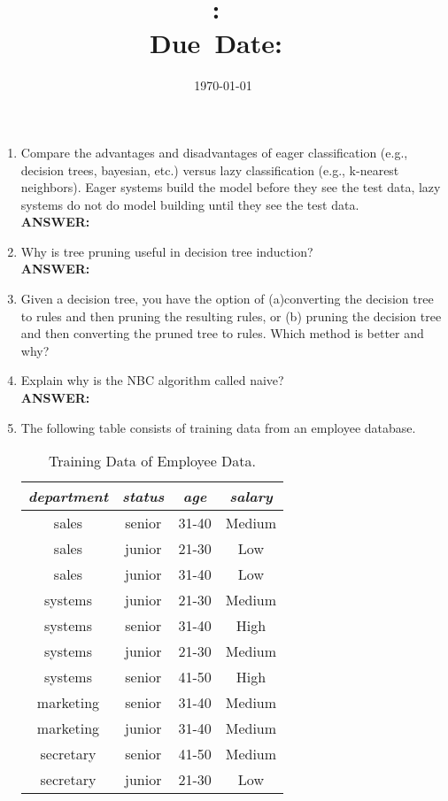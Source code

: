 \documentclass{article}
\title{\textbf{\hmwkClass:\ 
      \hmwkTitle}\\\normalsize\small{Due\ Date:\
    \hmwkDueDate}}
\date{\today}
\author{\textbf{\hmwkAuthorName}}
\begin{document}
\maketitle

\begin{enumerate}
\item Compare the advantages and disadvantages of eager classification
  (e.g., decision trees, bayesian, etc.) versus lazy classification
  (e.g., k-nearest neighbors). Eager systems build the model before
  they see the test data, lazy systems do not do model building until
  they see the test data. \\
\textbf{ANSWER:}


\item Why is tree pruning useful in decision tree induction? \\
\textbf{ANSWER:} 

\item Given a decision tree, you have the option of (a)converting the
  decision tree to rules and then pruning the resulting rules, or (b)
  pruning the decision tree and then converting the pruned tree to
  rules. Which method is better and why? 



\item Explain why is the NBC algorithm called naive? \\
\textbf{ANSWER:}

\item The following table consists of training data from an employee
  database.
\begin{table}[ht]
  \begin{center}
    \begin{tabular}{|c|c|c|c|}
      \hline {\it department} & {\it status}&{\it age}&{\it salary} \\
      \hline 
      sales & senior & 31-40 & Medium \\
      sales & junior & 21-30 & Low \\
      sales & junior & 31-40 & Low \\
      systems & junior & 21-30 & Medium \\
      systems & senior & 31-40 & High \\
      systems & junior & 21-30 & Medium \\
      systems & senior & 41-50 & High \\
      marketing & senior & 31-40 & Medium \\
      marketing & junior & 31-40 & Medium \\
      secretary & senior & 41-50 & Medium \\
      secretary & junior & 21-30 & Low \\
      \hline
    \end{tabular}
    \caption{Training Data of Employee Data.\label{tbl:dat_eple}}
  \end{center}
\end{table}


\end{enumerate}
\end{document}
